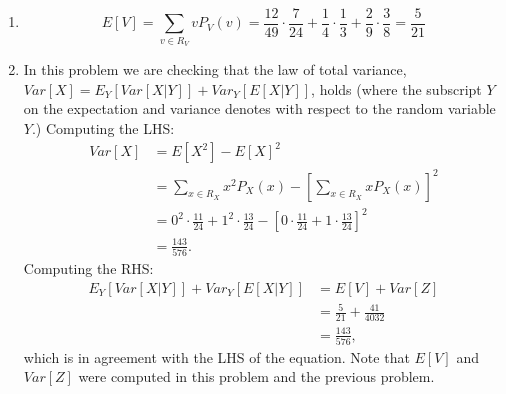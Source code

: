 \begin{problem}{14}
\begin{enumerate}
\item
\begin{equation*}
E[V] = \sum_{v \in R_V}v P_V(v) = \frac{12}{49}\cdot \frac{7}{24}+ \frac{1}{4}\cdot \frac{1}{3}+ \frac{2}{9}\cdot \frac{3}{8} =\frac{5}{21}
\end{equation*}

\item In this problem we are checking that the law of total variance, $Var[X] = E_Y[Var[X|Y]]+Var_Y[E[X|Y]]$, holds (where the subscript $Y$ on the expectation and variance denotes with respect to the random variable $Y$.)  Computing the LHS:
\begin{align*}
Var[X] &= E[X^2]-E[X]^2\\
& = \sum_{x \in R_X}x^2 P_X(x)- \left[\sum_{x \in R_X}x P_X(x)\right]^2 \\
& = 0^2\cdot \frac{11}{24}+1^2\cdot \frac{13}{24}-\left[ 0\cdot \frac{11}{24}+1\cdot \frac{13}{24} \right]^2\\
&=\frac{143}{576}.
\end{align*}
Computing the RHS:
\begin{align*}
E_Y[Var[X|Y]]+Var_Y[E[X|Y]] & = E[V]+Var[Z] \\
& = \frac{5}{21}+\frac{41}{4032} \\
& = \frac{143}{576},
\end{align*}
which is in agreement with the LHS of the equation.  Note that $E[V]$ and $Var[Z]$ were computed in this problem and the previous problem.

\end{enumerate}
\end{problem}



